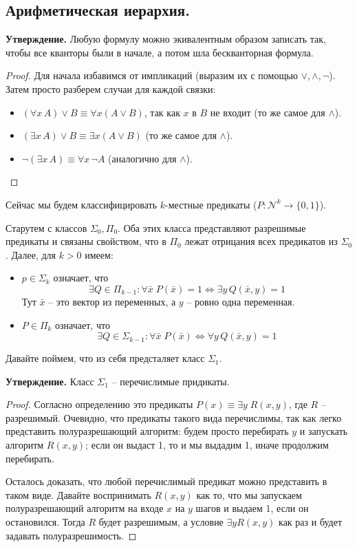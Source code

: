 \subsection{Арифметическая иерархия.}
\textbf{Утверждение.} Любую формулу можно экивалентным образом записать так, чтобы все кванторы были в начале, а потом шла бескванторная формула.
\begin{proof}
   Для начала избавимся от импликаций (выразим их с помощью $\lor, \land, \lnot$). Затем просто разберем случаи для каждой связки: \begin{itemize}
        \item $(\forall x \, A) \lor B \equiv \forall x (A \lor B)$, так как $x$ в $B$ не входит (то же самое для $\land$).
        \item  $(\exists x \, A) \lor B \equiv \exists x (A \lor B)$ (то же самое для $\land$).
        \item $\lnot (\exists x  \, A) \equiv \forall x \, \lnot A$ (аналогично для $\land$).
    \end{itemize}
\end{proof} 

Сейчас мы будем классифицировать $k$-местные предикаты ($P: \mathcal{N}^k \to \{ 0, 1 \}$). 

Старутем с классов $\Sigma_0, \Pi_0$. Оба этих класса представляют разрешимые предикаты и связаны свойством, что в $\Pi_0$ лежат отрицания всех предикатов из $\Sigma_0$. Далее, для $k > 0$ имеем: \begin{itemize}
    \item $p \in \Sigma_k$ означает, что \[\exists Q \in \Pi_{k - 1} : \forall \bar{x} \; P(\bar{x}) = 1 \Leftrightarrow \exists y \, Q(\bar{x}, y) = 1 \]
    Тут $\bar{x}$ -- это вектор из переменных, а $y$ -- ровно одна переменная.
    \item $P \in \Pi_k$ означает, что \[ \exists Q \in \Sigma_{k - 1} : \forall \bar{x} \; P(\bar{x}) \Leftrightarrow \forall y \, Q(\bar{x}, y) = 1  \]
\end{itemize}

Давайте поймем, что из себя предсталяет класс $\Sigma_1$. 

\textbf{Утверждение.} Класс $\Sigma_1$ -- перечислимые придикаты.

\begin{proof}
    Согласно определению это предикаты $P(x) \equiv \exists y \; R(x, y)$, где $R$ -- разрешимый. Очевидно, что предикаты такого вида перечислимы, так как легко представить полуразрешающий алгоритм: будем просто перебирать $y$ и запускать алгоритм $R(x, y)$; если он выдаст 1, то и мы выдадим 1, иначе продолжим перебирать. 
    
    Осталось доказать, что любой перечислимый предикат можно представить в таком виде. Давайте воспринимать $R(x, y)$ как то, что мы запускаем полуразрешающий алгоритм на входе $x$ на $y$ шагов и выдаем 1, если он остановился. Тогда $R$ будет разрешимым, а условие $\exists y R(x, y)$ как раз и будет задавать полуразрешимость.  
\end{proof}

